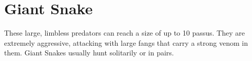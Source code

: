 \section{Giant Snake}

These large, limbless predators can reach a size of up to 10 passus. They are extremely aggressive, attacking with large fangs that carry a strong venom in them. Giant Snakes usually hunt solitarily or in pairs.